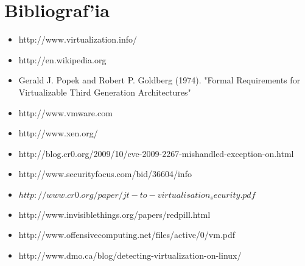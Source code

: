\section{Bibliograf'ia}

\begin{itemize}
	\item http://www.virtualization.info/
	\item http://en.wikipedia.org
	\item Gerald J. Popek and Robert P. Goldberg (1974). "Formal Requirements for Virtualizable Third Generation Architectures"
	\item http://www.vmware.com
	\item http://www.xen.org/
	\item http://blog.cr0.org/2009/10/cve-2009-2267-mishandled-exception-on.html
	\item http://www.securityfocus.com/bid/36604/info
	\item $http://www.cr0.org/paper/jt-to-virtualisation_security.pdf$
	\item http://www.invisiblethings.org/papers/redpill.html
	\item http://www.offensivecomputing.net/files/active/0/vm.pdf
	\item http://www.dmo.ca/blog/detecting-virtualization-on-linux/
\end{itemize}